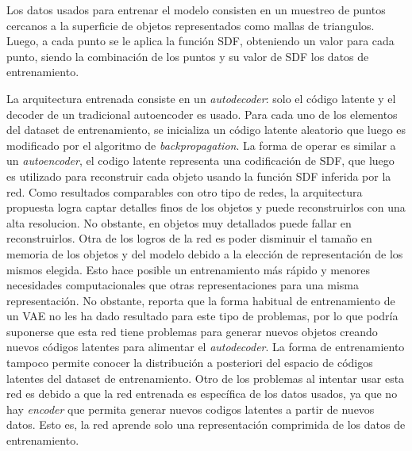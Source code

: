 \documentclass[12pt, spanish]{article}
\begin{document}
Los datos usados para entrenar el modelo consisten en un muestreo de puntos
cercanos a la superficie de objetos representados como mallas de triangulos.
Luego, a cada punto se le aplica la función SDF, obteniendo un valor para
cada punto, siendo la combinación de los puntos y su valor de SDF los datos
de entrenamiento.

La arquitectura entrenada consiste en un \textit{autodecoder}: solo el
código latente y el decoder de un tradicional autoencoder es usado. Para
cada uno de los elementos del dataset de entrenamiento, se inicializa un
código latente aleatorio que luego es modificado por el algoritmo de
\textit{backpropagation}. La forma de operar es similar a un
\textit{autoencoder}, el codigo latente representa una codificación de SDF,
que luego es utilizado para reconstruir cada objeto usando la función SDF
inferida por la red. Como resultados comparables con otro tipo de redes,
la arquitectura propuesta logra captar detalles finos de los objetos y
puede reconstruirlos con una alta resolucion. No obstante, en objetos
muy detallados puede fallar en reconstruirlos. Otra de los logros de la
red es poder disminuir el tamaño en memoria de los objetos y del modelo
debido a la elección de representación de los mismos elegida. Esto hace
posible un entrenamiento más rápido y menores necesidades computacionales
que otras representaciones para una misma representación. No obstante,
\cite{Park2019} reporta que la forma habitual de entrenamiento de un
VAE no les ha dado resultado para este tipo de problemas, por lo que
podría suponerse que esta red tiene problemas para generar nuevos objetos %
creando nuevos códigos latentes para alimentar el \textit{autodecoder}.
La forma de entrenamiento tampoco permite conocer la distribución a
posteriori del espacio de códigos latentes del dataset de entrenamiento.
Otro de los problemas al intentar usar esta red es debido a que la red
entrenada es específica de los datos usados, ya que no hay
\textit{encoder} que permita generar nuevos codigos latentes a partir
de nuevos datos. Esto es, la red aprende solo una representación
comprimida de los datos de entrenamiento.

\end{document}
